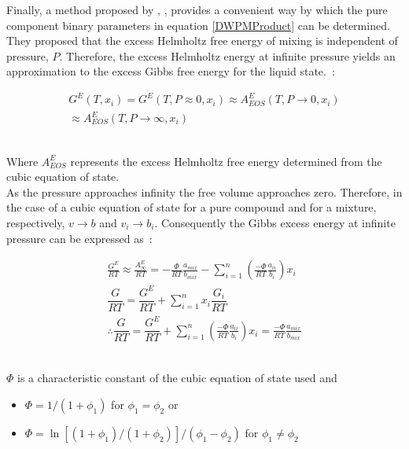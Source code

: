 Finally, a method proposed by \citeauthor{WongSandler}, \citeyear{WongSandler}, provides a convenient way by which the pure component binary parameters in equation \ref{DWPMProduct} can be determined. They proposed that the excess Helmholtz free energy of mixing is independent of pressure, $P$. Therefore, the excess Helmholtz energy at infinite pressure yields an approximation to the excess Gibbs free energy for the liquid state.~\cite{WongSandler, WeightedPowerMeanModel}:\

\begin{eqnarray}
  G^{E}(T, x_{i}) = G^{E}(T, P \approx 0, x_{i}) \approx A_{EOS}^{E}(T, P \rightarrow 0, x_{i})\\
  \approx A_{EOS}^E(T, P \rightarrow \infty, x_{i})
\end{eqnarray}\


Where $A^{E}_{EOS}$ represents the excess Helmholtz free energy determined from the cubic equation of state.\\

As the pressure approaches infinity the free volume approaches zero. Therefore, in the case of a cubic equation of state for a pure compound and for a mixture, respectively, $ v \rightarrow b$ and $v_{i} \rightarrow b_{i}$. Consequently the Gibbs excess energy at infinite pressure can be expressed as~\cite{HuronVidal, Vidal}:\

\begin{eqnarray}
  \frac{G^{E}}{RT} \approx \frac{A^{E}_{\infty}}{RT} = -\frac{\Phi}{RT} \frac{a_{mix}}{b_{mix}} -\sum_{i = 1}^{n}\left(\frac{-\Phi}{RT} \frac{a_{ii}}{b_{i}}\right)x_{i} \label{DWPMPureParamsDeriv}\\
  \dfrac{G}{RT} = \dfrac{G^{E}}{RT} + \sum_{i=1}^{n}x_{i}\dfrac{G_{i}}{RT}\\
   \therefore \dfrac{G}{RT} = \dfrac{G^{E}}{RT} +\sum_{i=1}^{n}\left(\frac{-\Phi}{RT} \frac{a_{ii}}{b_{i}}\right)x_{i} = \frac{-\Phi}{RT} \frac{a_{mix}}{b_{mix}} 
\end{eqnarray}\


$\Phi$ is a characteristic constant of the cubic equation of state used and\\

\begin{itemize}
\item $\Phi = 1/\left(1+\phi_{1}\right)$ for $\phi_{1} = \phi_{2}$ or
\item $\Phi = \ln \left[\left(1+\phi_{1}\right)/\left(1+\phi_{2}\right)\right]/\left(\phi_{1} - \phi_{2}\right)$ for  $\phi_{1} \neq \phi_{2}$
\end{itemize}\

